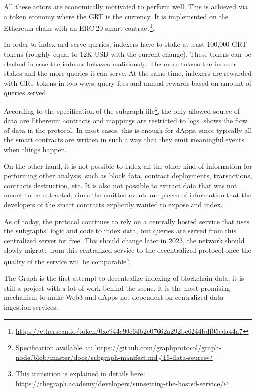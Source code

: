 All these actors are economically motivated to perform well. This is achieved via a token economy where the GRT is the currency. It is implemented on the Ethereum chain with an ERC-20 smart contract\footnote{\url{https://etherscan.io/token/0xc944e90c64b2c07662a292be6244bdf05cda44a7}}.

In order to index and serve queries, indexers have to stake at least 100,000 GRT tokens (roughly equal to 12K USD with the current change). These tokens can be slashed in case the indexer behaves maliciously. The more tokens the indexer stakes and the more queries it can serve. At the same time, indexers are rewarded with GRT tokens in two ways: query fees and annual rewards based on amount of queries served.

According to the specification of the subgraph file\footnote{Specification available at: \url{https://github.com/graphprotocol/graph-node/blob/master/docs/subgraph-manifest.md\#15-data-source}}, the only allowed source of data are Ethereum contracts and mappings are restricted to logs.  shows the flow of data in the protocol. In most cases, this is enough for dApps, since typically all the smart contracts are written in such a way that they emit meaningful events when things happen. 

On the other hand, it is not possible to index all the other kind of information for performing other analysis, such as block data, contract deployments, transactions, contracts destruction, etc. It is also not possible to extract data that was not meant to be extracted, since the emitted events are pieces of information that the developers of the smart contracts explicitly wanted to expose and index. 

As of today, the protocol continues to rely on a centrally hosted service that uses the subgraphs' logic and code to index data, but queries are served from this centralized server for free. This should change later in 2023, the network should slowly migrate from this centralized service to the decentralized protocol once the quality of the service will be comparable\footnote{This transition is explained in details here: \url{https://thegraph.academy/developers/sunsetting-the-hosted-service/}}.

The Graph is the first attempt to decentralize indexing of blockchain data, it is still a project with a lot of work behind the scene. It is the most promising mechanism to make Web3 and dApps not dependent on centralized data ingestion services.

